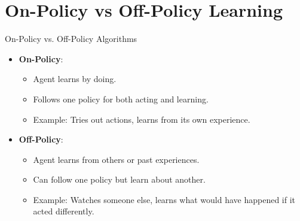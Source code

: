 \section{On-Policy vs Off-Policy Learning}
\begin{frame}{On-Policy vs. Off-Policy Algorithms}
\begin{itemize}
    \item \textbf{On-Policy}:
    \begin{itemize}
        \item Agent learns by doing.
        \item Follows one policy for both acting and learning.
        \item Example: Tries out actions, learns from its own experience.
    \end{itemize}
    \item \textbf{Off-Policy}:
    \begin{itemize}
        \item Agent learns from others or past experiences.
        \item Can follow one policy but learn about another.
        \item Example: Watches someone else, learns what would have happened if it acted differently.
    \end{itemize}
\end{itemize}
    
\end{frame}